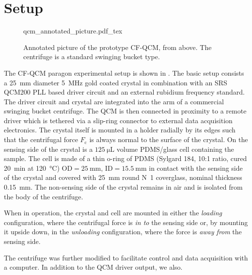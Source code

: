 \section{Setup}
\begin{figure}[ht]
\centering
{qcm_annotated_picture.pdf_tex}
\caption{Annotated picture of the prototype CF-QCM, from above.  The
centrifuge is a standard swinging bucket type.}
\label{fig:cfqcmexpsetup}
\end{figure}
The CF-QCM paragon experimental setup is shown in
.  The basic setup consists a
\SI{25}{\milli\meter} diameter \SI{5}{\mega\hertz} gold coated crystal in
combination with an SRS QCM200 PLL based driver circuit and an external
rubidium frequency standard.  The driver circuit and crystal are integrated
into the arm of a commercial swinging bucket centrifuge.  The QCM is then
connected in proximity to a remote driver which is tethered via a slip-ring
connector to external data acquisition electronics.  The crystal itself is
mounted in a holder radially by its edges such that the centrifugal force
$F_\mathrm{c}$ is always normal to the surface of the crystal.  On the
sensing side of the crystal is a $\SI{125}{\micro\liter}$ volume PDMS/glass
cell containing the sample.  The cell is made of a thin o-ring of PDMS
(Sylgard 184, 10:1 ratio, cured \SI{20}{\minute} at \SI{120}{\celsius})
$\text{OD}=\SI{25}{\milli\meter}$, $\text{ID}=\SI{15.5}{\milli\meter}$ in
contact with the sensing side of the crystal and covered with
\SI{25}{\milli\meter} round N~1
coverglass, nominal thickness \SI{0.15}{\milli\meter}.  The non-sensing
side of the crystal remains in air and is isolated from the body of the
centrifuge.  

When in operation, the crystal and cell are mounted in either the
\textit{loading} configuration, where the centrifugal force is \textit{in
to} the sensing side or, by mounting it upside down, in the
\textit{unloading} configuration, where the force is \textit{away from} the
sensing side.

The centrifuge was further modified to facilitate control and data
acquisition with a computer.  In addition to the QCM driver output, we
also.

